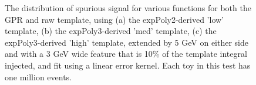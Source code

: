 \begin{figure} 
\begin{center}

\caption{The distribution of spurious signal for various functions for both the GPR and raw template, using (a) the expPoly2-derived 'low' template, (b) the expPoly3-derived 'med' template, (c) the expPoly3-derived 'high' template, extended by 5 GeV on either side and with a 3 GeV wide feature that is 10\% of the template integral injected, and fit using a linear error kernel. Each toy in this test has one million events.}
\label{fig:linearkernel_lowpt_100k_Siginj}
\end{center}
\end{figure}

